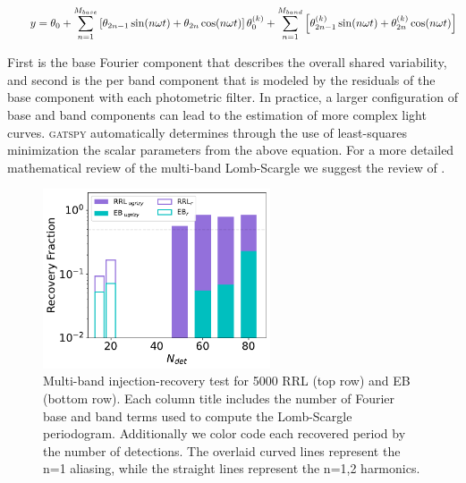 \documentclass[DM,authoryear,toc]{lsstdoc}
\begin{document}
\begin{equation}
\qquad y = \theta_0+\sum_{n=1}^{M_{base}}\left[\theta_{2 n-1} \sin (n \omega t)+\theta_{2 n} \cos (n \omega t)\right] \\
\theta_0^{(k)}+\sum_{n=1}^{M _{band}}\left[\theta_{2 n-1}^{(k)} \sin (n \omega t)+\theta_{2 n}^{(k)} \cos (n \omega t)\right]
\end{equation}

First is the base Fourier component that describes the overall shared variability, and second is the per band component that is modeled by the residuals of the base component with each photometric filter. In practice, a larger configuration of base and band components can lead to the estimation of more complex light curves. \textsc{gatspy} automatically determines through the use of least-squares minimization the scalar parameters from the above equation. For a more detailed mathematical review of the multi-band Lomb-Scargle we suggest the review of \citet{VanderPlas:VP2015}. 



\begin{figure}
  \includegraphics[width=0.6\textwidth]{figures/multi_vs_single_rec_frac.pdf}
  \centering 
  \caption{Multi-band injection-recovery test for 5000 RRL (top row) and EB (bottom row). Each column title includes the number of Fourier base and band terms used to compute the Lomb-Scargle periodogram. Additionally we color code each recovered period by the number of detections. The overlaid curved lines represent the n=1 aliasing, while the straight lines represent the n=1,2 harmonics.}
\end{figure}
\end{document}
